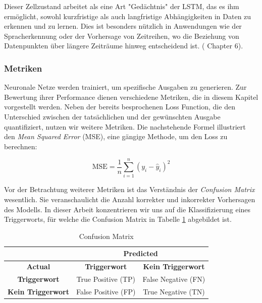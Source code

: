 \documentclass[11pt,a4paper]{article}
\newcommand{\formulas}[1]{
	\addcontentsline{equ}{formulas}{\protect\numberline{\theequation}#1}\par
}
\begin{document}
\noindent \newline
Dieser Zellzustand arbeitet als eine Art "Gedächtnis" der LSTM, das es ihm ermöglicht, sowohl 
kurzfristige als auch langfristige Abhängigkeiten in Daten zu erkennen und zu lernen. Dies ist 
besonders nützlich in Anwendungen wie der Spracherkennung oder der Vorhersage von Zeitreihen, wo 
die Beziehung von Datenpunkten über längere Zeiträume hinweg entscheidend ist. 
(\cite{weidman2019deep} Chapter 6).

\subsubsection{Metriken}
Neuronale Netze werden trainiert, um spezifische Ausgaben zu generieren. Zur Bewertung ihrer 
Performance dienen verschiedene Metriken, die in diesem Kapitel vorgestellt werden. Neben der bereits 
besprochenen Loss Function, die den Unterschied zwischen der tatsächlichen und der gewünschten 
Ausgabe quantifiziert, nutzen wir weitere Metriken. Die nachstehende Formel illustriert den 
\textit{Mean Squared Error} (MSE), eine gängige Methode, um den Loss zu berechnen:

\begin{equation}
    \text{MSE} = \frac{1}{n} \sum_{i=1}^{n} (y_{i} - \hat{y}_{i})^{2}
	\label{eq:mse}
\end{equation}
\formulas{Mean Squared Error}

\noindent
Vor der Betrachtung weiterer Metriken ist das Verständnis der \textit{Confusion Matrix} wesentlich. 
Sie veranschaulicht die Anzahl korrekter und inkorrekter Vorhersagen des Modells. In dieser Arbeit 
konzentrieren wir uns auf die Klassifizierung eines Triggerworts, für welche die Confusion Matrix 
in Tabelle \ref{tab:confusion_matrix} abgebildet ist.

\begin{table}[H]
	\centering
	\begin{tabular}{|c|c|c|}
		\cline{2-3}
		\multicolumn{1}{c|}{} & \multicolumn{2}{c|}{\textbf{Predicted}} \\ \hline
		\textbf{Actual}     & \textbf{Triggerwort} & \textbf{Kein Triggerwort} \\ \hline
		\textbf{Triggerwort} & True Positive (TP)   & False Negative (FN)       \\ \hline
		\textbf{Kein Triggerwort} & False Positive (FP)  & True Negative (TN)        \\ \hline
	\end{tabular}
	\caption{Confusion Matrix}
	\label{tab:confusion_matrix}	
\end{table}
\end{document}
